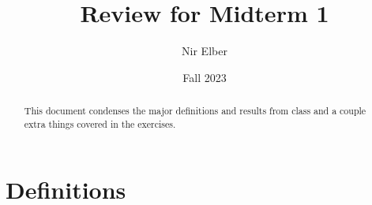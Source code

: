\documentclass{article}
\title{Review for Midterm 1}
\author{Nir Elber}
\date{Fall 2023}
\begin{document}
\maketitle

\begin{abstract}
	\noindent This document condenses the major definitions and results from class and a couple extra things covered in the exercises.
\end{abstract}

\setcounter{secnumdepth}{4}
\setcounter{tocdepth}{4}
\tableofcontents

\newpage

\section{Definitions}
\end{document}
